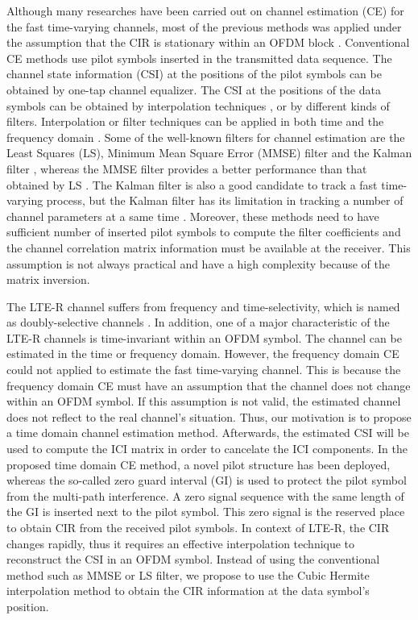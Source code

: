 \documentclass[AMA]{WileyNJD-v1}
\begin{document}
Although many researches have been carried out on channel estimation (CE) for the fast time-varying channels, most of the previous methods was applied under the assumption that the CIR is stationary within an OFDM block \cite {Hu2003, Tang2007, Park2005}. Conventional CE methods use pilot symbols inserted in the transmitted data sequence. The channel state information (CSI) at the positions of the pilot symbols can be obtained by one-tap channel equalizer. The CSI at the positions of the data symbols can be obtained by interpolation techniques \cite{Cavers1991, Lau1994}, or by different kinds of filters. Interpolation or filter techniques can be applied in both time and the frequency domain \cite{Mostofi2005,Hijazi2009,Simko2011}. Some of the well-known filters for channel estimation are the  Least Squares (LS), Minimum Mean Square Error (MMSE) filter \cite{Mostofi2005,Hijazi2009,Simko2011} and the Kalman filter \cite{Kaufman1983}, whereas the MMSE filter provides a better performance than that obtained by LS \cite{Edfors1998}. The Kalman filter is also a good candidate to track a fast time-varying process, but the Kalman filter has its limitation in tracking a number of channel parameters at a same time \cite{Kaufman1983}. Moreover, these methods need to have sufficient number of inserted pilot symbols to compute the filter coefficients and the channel correlation matrix information must be available at the receiver. This assumption is not always practical and have a high complexity because of the matrix inversion. 

The LTE-R channel suffers from frequency and time-selectivity, which is named as doubly-selective channels \cite{Adireddy2002,Fan2014}. In addition, one of a major characteristic of the LTE-R channels is time-invariant within an OFDM symbol. The channel can be estimated in the time or frequency domain. However, the frequency domain CE could not applied to estimate the fast time-varying channel. This is because the frequency  domain CE must have an assumption that the channel does not change within an OFDM symbol. If this assumption is not valid, the estimated channel does not reflect to the real channel's situation. Thus, our motivation is to propose a time domain channel estimation method. Afterwards, the estimated CSI will be used to compute the ICI matrix in order to cancelate the ICI components. In the proposed time domain CE method, a novel pilot structure has been deployed, whereas the so-called zero guard interval (GI) is used to protect the pilot symbol from the multi-path interference. A zero signal sequence with the same length of the GI is inserted next to the pilot symbol. This zero signal is the reserved place  to obtain CIR from the received pilot symbols. In context of LTE-R, the CIR changes rapidly, thus it requires an effective interpolation technique to reconstruct the CSI in an OFDM symbol. Instead of using the conventional method such as MMSE or LS filter, we propose to use the Cubic Hermite interpolation method to obtain the CIR information at the data symbol's position.
\end{document}
